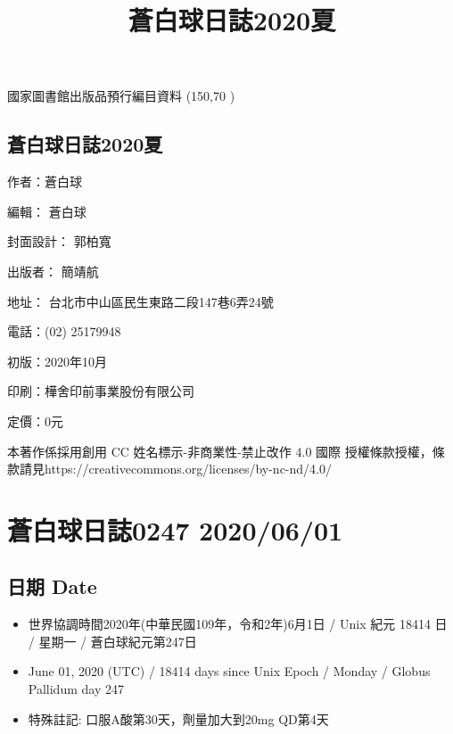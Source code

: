 \documentclass[a5paper, 11pt
]{book}
\title{蒼白球日誌2020夏}
\date{}
\providecommand{\tightlist}{%
  \setlength{\itemsep}{0pt}\setlength{\parskip}{0pt}}
\begin{document}
\clearpage\maketitle
\thispagestyle{empty}
\subsection{}
\begin{flushleft}
國家圖書館出版品預行編目資料 \linebreak
\framebox(150,70
){}
\end{flushleft}
\subsection{蒼白球日誌2020夏}
\begin{flushleft}
作者：蒼白球

編輯： 蒼白球

封面設計： 郭柏寬

出版者： 簡靖航

地址： 台北市中山區民生東路二段147巷6弄24號

電話：(02) 25179948

初版：2020年10月

印刷：樺舍印前事業股份有限公司

定價：0元

本著作係採用創用 CC 姓名標示-非商業性-禁止改作 4.0 國際 授權條款授權，條款請見\linebreak https://creativecommons.org/licenses/by-nc-nd/4.0/
\end{flushleft}
\clearpage
\tableofcontents

\hypertarget{ux84bcux767dux7403ux65e5ux8a8c0247-20200601}{%
\section{蒼白球日誌0247
2020/06/01}\label{ux84bcux767dux7403ux65e5ux8a8c0247-20200601}}

\hypertarget{ux65e5ux671f-date}{%
\subsection{日期 Date}\label{ux65e5ux671f-date}}

\begin{itemize}
\tightlist
\item
  世界協調時間2020年(中華民國109年，令和2年)6月1日 / Unix 紀元 18414 日
  / 星期一 / 蒼白球紀元第247日
\item
  June 01, 2020 (UTC) / 18414 days since Unix Epoch / Monday / Globus
  Pallidum day 247
\item
  特殊註記: 口服A酸第30天，劑量加大到20mg QD第4天
\end{itemize}
\end{document}
